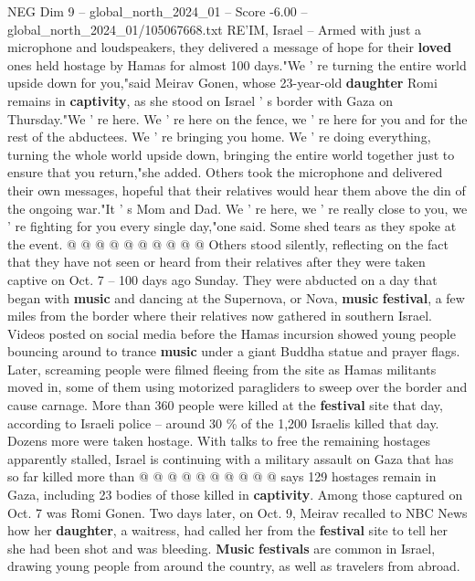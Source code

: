 \begin{textsample}{NEG Dim 9 – global\_north\_2024\_01 – Score -6.00 – global\_north\_2024\_01/105067668.txt}  \label{ex:f9_neg_199}
RE'IM, Israel -- Armed with just a microphone and loudspeakers, they delivered a message of hope for their \textbf{loved} ones held hostage by Hamas for almost 100 days."We ' re turning the entire world upside down for you,"said Meirav Gonen, whose 23-year-old \textbf{daughter} Romi remains in \textbf{captivity}, as she stood on Israel ' s border with Gaza on Thursday."We ' re here.
We ' re here on the fence, we ' re here for you and for the rest of the abductees.
We ' re bringing you home.
We ' re doing everything, turning the whole world upside down, bringing the entire world together just to ensure that you return,"she added.
Others took the microphone and delivered their own messages, hopeful that their relatives would hear them above the din of the ongoing war."It ' s Mom and Dad.
We ' re here, we ' re really close to you, we ' re fighting for you every single day,"one said.
Some shed tears as they spoke at the event. @ @ @ @ @ @ @ @ @ @ Others stood silently, reflecting on the fact that they have not seen or heard from their relatives after they were taken captive on Oct. 7 -- 100 days ago Sunday.
They were abducted on a day that began with \textbf{music} and dancing at the Supernova, or Nova, \textbf{music} \textbf{festival}, a few miles from the border where their relatives now gathered in southern Israel.
Videos posted on social media before the Hamas incursion showed young people bouncing around to trance \textbf{music} under a giant Buddha statue and prayer flags.
Later, screaming people were filmed fleeing from the site as Hamas militants moved in, some of them using motorized paragliders to sweep over the border and cause carnage.
More than 360 people were killed at the \textbf{festival} site that day, according to Israeli police -- around 30 \% of the 1,200 Israelis killed that day.
Dozens more were taken hostage.
With talks to free the remaining hostages apparently stalled, Israel is continuing with a military assault on Gaza that has so far killed more than @ @ @ @ @ @ @ @ @ @ says 129 hostages remain in Gaza, including 23 bodies of those killed in \textbf{captivity}.
Among those captured on Oct. 7 was Romi Gonen.
Two days later, on Oct. 9, Meirav recalled to NBC News how her \textbf{daughter}, a waitress, had called her from the \textbf{festival} site to tell her she had been shot and was bleeding. \textbf{Music} \textbf{festivals} are common in Israel, drawing young people from around the country, as well as travelers from abroad.

\end{textsample}
